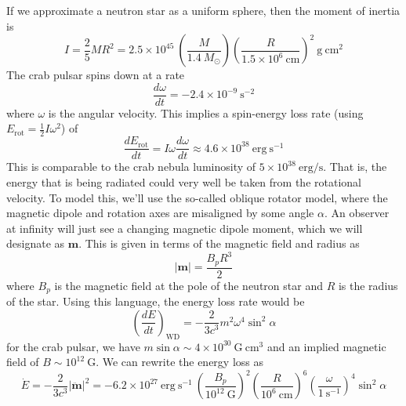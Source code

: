 \documentclass[10pt]{article}
\numberwithin{equation}{section}
\newcommand{\n}{\noindent}
\newcommand{\norm}[1]{\left\lvert#1\right\rvert}
\begin{document}
	\n If we approximate a neutron star as a uniform sphere, then the moment of inertia is
	\begin{equation}
		\label{eq:spindown:1} I = \frac{2}{5}M R^2 = 2.5\times 10^{45}\ \left(\frac{M}{1.4\ M_\odot}\right) \left(\frac{R}{1.5\times 10^6\ \mathrm{cm}}\right)^{2}\ \mathrm{g\ cm^2}
	\end{equation}
	The crab pulsar spins down at a rate
	\begin{equation}
		\label{eq:spindown:2} \frac{d\omega}{dt} = -2.4\times 10^{-9}\ \mathrm{s^{-2}}
	\end{equation}
	where $\omega$ is the angular velocity. This implies a spin-energy loss rate (using $E_{\mathrm{rot}} = \frac{1}{2} I \omega^2$) of
	\begin{equation}
		\label{eq:spindown:3} \frac{dE_{\mathrm{rot}}}{dt} = I\omega\frac{d\omega}{dt} \approx 4.6\times 10^{38}\ \mathrm{erg\ s^{-1}}
	\end{equation}
	This is comparable to the crab nebula luminosity of $5\times 10^{38}\ \mathrm{erg/s}$. That is, the energy that is being radiated could very well be taken from the rotational velocity. To model this, we'll use the so-called oblique rotator model, where the magnetic dipole and rotation axes are misaligned by some angle $\alpha$. An observer at infinity will just see a changing magnetic dipole moment, which we will designate as $\mathbf{m}$. This is given in terms of the magnetic field and radius as
	\begin{equation}
		\label{eq:spindown:4} \norm{\mathbf{m}} = \frac{B_p R^3}{2}
	\end{equation}
	where $B_p$ is the magnetic field at the pole of the neutron star and $R$ is the radius of the star. Using this language, the energy loss rate would be
	\begin{equation}
		\label{eq:spindown:5} \left(\frac{dE}{dt}\right)_{\mathrm{WD}} = -\frac{2}{3c^3}m^2\omega^4\sin^2\alpha
	\end{equation}
	for the crab pulsar, we have $m\sin\alpha\sim 4\times 10^{30}\ \mathrm{G\ cm^3}$ and an implied magnetic field of $B\sim 10^{12}\ \mathrm{G}$. We can rewrite the energy loss as
	\begin{equation}
		\label{eq:spindown:6} \dot{E} = -\frac{2}{3c^3}\norm{\ddot{\mathbf{m}}}^2 = -6.2\times 10^{27}\ \mathrm{erg\ s^{-1}}\ \left(\frac{B_p}{10^{12}\ \mathrm{G}}\right)^2 \left(\frac{R}{10^6\ \mathrm{cm}}\right)^6 \left(\frac{\omega}{\mathrm{1\ s^{-1}}}\right)^4\sin^2\alpha
	\end{equation}
\end{document}
